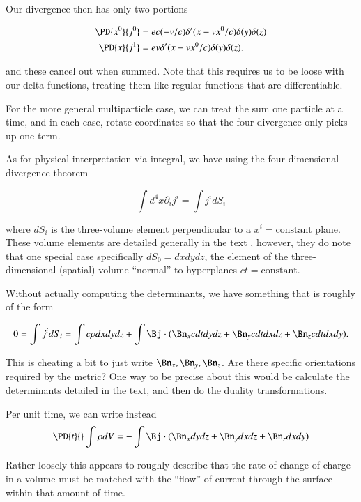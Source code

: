 {Our divergence then has only two portions

\begin{equation}\label{eqn:relElectroDynProblemSet3:2060}
\begin{aligned}
\PD{x^0}{j^0} &= e c (-v/c) \delta'(x - v x^0/c) \delta(y) \delta(z) \\
\PD{x}{j^1} &= e v \delta'(x - v x^0/c) \delta(y) \delta(z).
\end{aligned}
\end{equation}

and these cancel out when summed.  Note that this requires us to be loose with our delta functions, treating them like regular functions that are differentiable.

For the more general multiparticle case, we can treat the sum one particle at a time, and in each case, rotate coordinates so that the four divergence only picks up one term.

As for physical interpretation via integral, we have using the four dimensional divergence theorem

\begin{equation}\label{eqn:relElectroDynProblemSet3:2080}
\int d^4 x \partial_i j^i = \int j^i dS_i
\end{equation}

where \(dS_i\) is the three-volume element perpendicular to a \(x^i = \text{constant}\) plane.  These volume elements are detailed generally in the text \citep{landau1980classical}, however, they do note that one special case specifically \(dS_0 = dx dy dz\), the element of the three-dimensional (spatial) volume ``normal'' to hyperplanes \(ct = \text{constant}\).

Without actually computing the determinants, we have something that is roughly of the form

\begin{equation}\label{eqn:relElectroDynProblemSet3:2100}
0
= \int j^i dS_i
=
\int c \rho dx dy dz
+\int \Bj \cdot (\Bn_x c dt dy dz + \Bn_y c dt dx dz + \Bn_z c dt dx dy).
\end{equation}

This is cheating a bit to just write \(\Bn_x, \Bn_y, \Bn_z\).  Are there specific orientations required by the metric?  One way to be precise about this would be calculate the determinants detailed in the text, and then do the duality transformations.

Per unit time, we can write instead
\begin{equation}\label{eqn:relElectroDynProblemSet3:2120}
\PD{t}{} \int \rho dV
= -\int \Bj \cdot (\Bn_x dy dz + \Bn_y dx dz + \Bn_z dx dy)
\end{equation}

Rather loosely this appears to roughly describe that the rate of change of charge in a volume must be matched with the ``flow'' of current through the surface within that amount of time.

}
